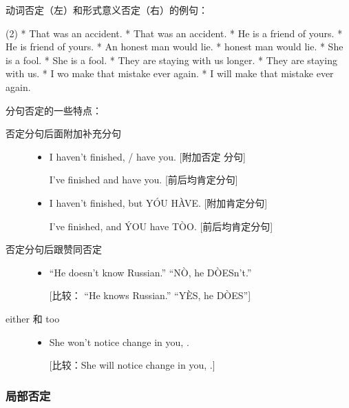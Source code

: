 动词否定（左）和形式意义否定（右）的例句：
\begin{taskitem}(2)
  * That was  an accident.
  * That was  an accident.
  * He is  a friend of yours.
  * He is  friend of yours.
  * An honest man would  lie.
  *  honest man would lie.
  * She is a fool.
  * She is  a fool.
  * They are  staying with us  longer.
  * They are  staying with us.
  * I wo make that mistake ever again.
  * I will  make that mistake ever again.
\end{taskitem}

分句否定的一些特点：
\begin{description}
\item[否定分句后面附加补充分句]
  \begin{itemize}
  \item I haven't finished, / have you. [附加否定
    分句]

    I've finished and  have you. [前后均肯定分句]

  \item I haven't finished, but Y\'OU H\`AVE. [附加肯定分句]

    I've finished, and \'YOU have T\`OO. [前后均肯定分句]
  \end{itemize}

\item[否定分句后跟赞同否定]
  \begin{itemize}
  \item ``He doesn't know Russian.'' ``N\`O, he D\`OESn't.''

  [比较： ``He knows Russian.'' ``Y\`ES, he D\`OES'']
  \end{itemize}

\item[either 和 too]
  \begin{itemize}
  \item She won't notice  change in you, .

  [比较：She will notice  change in you, .]
  \end{itemize}
\end{description}

\subsubsection{局部否定}

